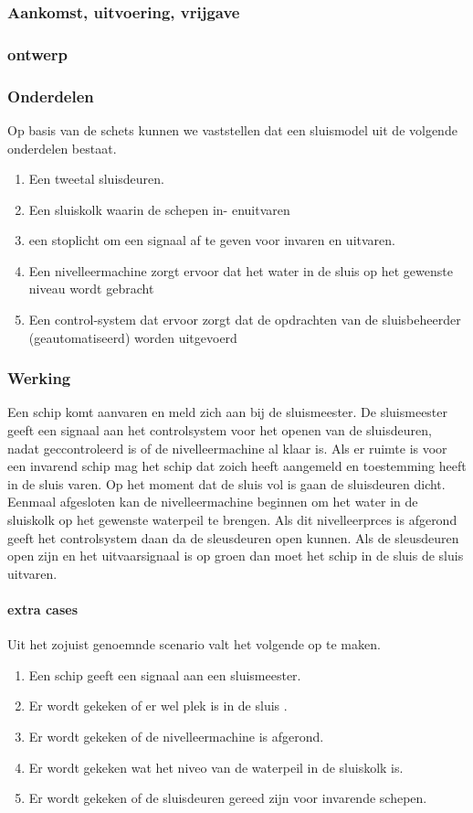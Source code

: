 {{{{{{{{{{{{{{\subsubsection{Aankomst, uitvoering, vrijgave}


\subsubsection{ontwerp}


\subsubsection{Onderdelen}
Op basis van de schets kunnen we vaststellen dat een sluismodel uit de volgende onderdelen bestaat.

\begin{enumerate}
	\item Een tweetal sluisdeuren. 
	\item Een sluiskolk waarin de schepen in- enuitvaren
	\item een stoplicht om een signaal af te geven voor invaren en uitvaren.
	\item Een nivelleermachine zorgt ervoor dat het water in de sluis op het gewenste niveau wordt gebracht
	\item Een control-system dat ervoor zorgt dat de opdrachten van de sluisbeheerder (geautomatiseerd) worden uitgevoerd
\end{enumerate}
\subsubsection{Werking}

Een schip komt aanvaren en meld zich aan bij de sluismeester. De sluismeester geeft een signaal aan het controlsystem voor het openen van de sluisdeuren, nadat geccontroleerd is of de nivelleermachine al klaar is. Als er ruimte is voor een invarend schip mag het schip dat zoich heeft aangemeld en toestemming heeft  in de sluis varen. Op het moment dat de sluis vol is gaan de sluisdeuren dicht. Eenmaal afgesloten kan de nivelleermachine beginnen om het water in de sluiskolk op het gewenste waterpeil te brengen. Als dit nivelleerprces is afgerond geeft  het controlsystem daan da de sleusdeuren open kunnen.  Als de sleusdeuren open zijn en het uitvaarsignaal is op groen dan moet het schip in de sluis de sluis uitvaren.
\paragraph{extra cases}
Uit het zojuist genoemnde scenario valt het volgende op te maken.
\begin{enumerate}
	\item Een schip geeft een signaal aan een sluismeester.
	\item Er wordt gekeken of er wel plek is in de sluis .
	\item Er wordt gekeken of de nivelleermachine is afgerond.
	\item Er wordt gekeken wat het niveo van de waterpeil in de sluiskolk is.
	\item Er wordt gekeken of de sluisdeuren gereed zijn voor invarende schepen.
\end{enumerate}
}}}}}}}}}}}}}}
